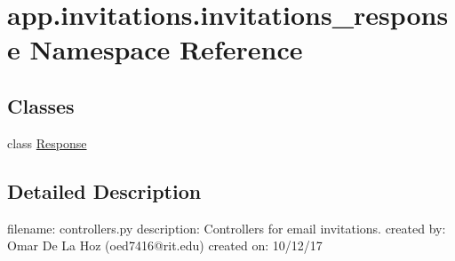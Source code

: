 \hypertarget{namespaceapp_1_1invitations_1_1invitations__response}{}\section{app.\+invitations.\+invitations\+\_\+response Namespace Reference}
\label{namespaceapp_1_1invitations_1_1invitations__response}
\subsection*{Classes}
\begin{DoxyCompactItemize}
\item 
class \mbox{\hyperlink{classapp_1_1invitations_1_1invitations__response_1_1_response}{Response}}
\end{DoxyCompactItemize}


\subsection{Detailed Description}
\begin{DoxyVerb}filename: controllers.py
description: Controllers for email invitations.
created by: Omar De La Hoz (oed7416@rit.edu)
created on: 10/12/17
\end{DoxyVerb}
 